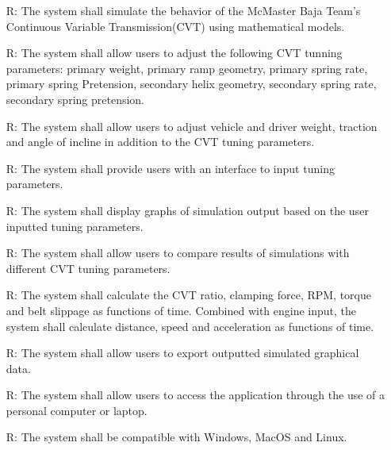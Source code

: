 \documentclass[12pt]{article}
\newcounter{reqnum} %
\begin{document}
\noindent \begin{itemize}

\item[R\refstepcounter{reqnum}\thereqnum \label{R_Inputs}:] The system shall simulate the behavior of the McMaster Baja Team's Continuous Variable Transmission(CVT) using mathematical models.

\item[R\refstepcounter{reqnum}\thereqnum \label{R_Inputs}:] The system shall allow users to adjust the following CVT tunning parameters: primary weight, primary ramp geometry, primary spring rate, primary spring Pretension, secondary helix geometry, secondary spring rate, secondary spring pretension. 

\item[R\refstepcounter{reqnum}\thereqnum \label{R_Inputs}:] The system shall allow users to adjust vehicle and driver weight, traction and angle of incline in addition to the CVT tuning parameters.

\item[R\refstepcounter{reqnum}\thereqnum \label{R_Inputs}:] The system shall provide users with an interface to input tuning parameters.

\item[R\refstepcounter{reqnum}\thereqnum \label{R_Inputs}:] The system shall display graphs of simulation output based on the user inputted tuning parameters.

\item[R\refstepcounter{reqnum}\thereqnum \label{R_Inputs}:] The system shall allow users to compare results of simulations with different CVT tuning parameters.

\item[R\refstepcounter{reqnum}\thereqnum \label{R_Inputs}:] The system shall calculate the CVT ratio, clamping force, RPM, torque and belt slippage as functions of time. Combined with engine input, the system shall calculate distance, speed and acceleration as functions of time.

\item[R\refstepcounter{reqnum}\thereqnum \label{R_Inputs}:] The system shall allow users to export outputted simulated graphical data.

\item[R\refstepcounter{reqnum}\thereqnum \label{R_Inputs}:] The system shall allow users to access the application through the use of a personal computer or laptop.

\item[R\refstepcounter{reqnum}\thereqnum \label{R_Inputs}:] The system shall be compatible with Windows, MacOS and Linux.
\end{itemize}
\end{document}
